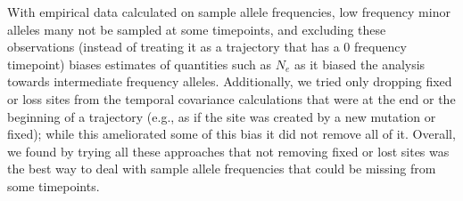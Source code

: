 \documentclass[11pt]{article}
\begin{document}
{{With empirical data calculated on sample allele
 frequencies, low frequency minor alleles many not be sampled at some
 timepoints, and excluding these observations (instead of treating it as a
 trajectory that has a 0 frequency timepoint) biases estimates of
 quantities such as $N_e$ as it biased the analysis towards
 intermediate frequency alleles.
 Additionally, we tried only dropping fixed or loss sites from the temporal
 covariance calculations that were at the end or the beginning of a trajectory
 (e.g., as if the site was created by a new mutation or fixed); while this
 ameliorated some of this bias it did not remove all of it. 
 Overall, we found by trying all these approaches that not removing fixed or lost sites was the best way to deal with
 sample allele frequencies that could be missing from some timepoints. }



}
\end{document}
